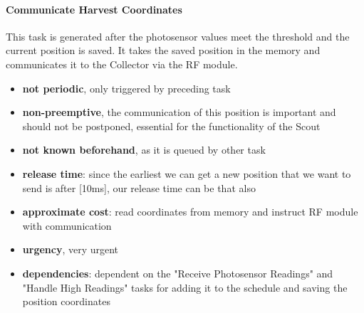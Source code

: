 \documentclass[12pt]{article}
\begin{document}
\paragraph{Communicate Harvest Coordinates}
This task is generated after the photosensor values meet the threshold and the current position is saved. It takes the saved position in the memory and communicates it to the Collector via the RF module.
\begin{itemize}
	\item \textbf{not periodic}, only triggered by preceding task
	\item \textbf{non-preemptive}, the communication of this position is important and should not be postponed, essential for the functionality of the Scout
	\item \textbf{not known beforehand}, as it is queued by other task
	\item \textbf{release time}: since the earliest we can get a new position that we want to send is after [10ms], our release time can be that also
	\item \textbf{approximate cost}: read coordinates from memory and instruct RF module with communication 
	\item \textbf{urgency}, very urgent
	\item \textbf{dependencies}: dependent on the "Receive Photosensor Readings" and "Handle High Readings" tasks for adding it to the schedule and saving the position coordinates
\end{itemize}
\end{document}
